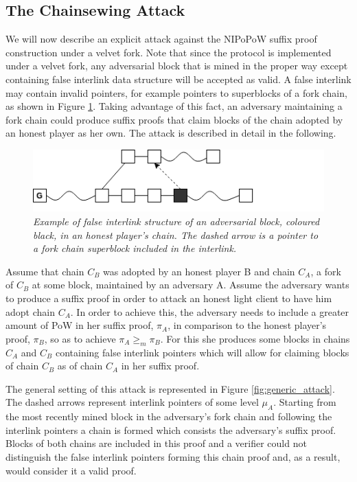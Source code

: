\documentclass[11pt,a4paper]{article}
\begin{document}
\subsection{The Chainsewing Attack}
We  will now describe an explicit attack against the NIPoPoW suffix proof construction under a velvet fork. Note that since the protocol is implemented under a velvet fork, any adversarial block that is mined in the proper way except containing false interlink data structure will be accepted as valid. A false interlink may contain invalid pointers, for example pointers to superblocks of a fork chain, as shown in Figure \ref{fig:false_interlink}.
Taking advantage of this fact, an adversary maintaining a fork chain could produce suffix proofs that claim blocks of the chain adopted by an honest player as her own. The attack is described in detail in the following.

\begin{figure}[h]
	\begin{center}
		\includegraphics[scale=0.6]{figures/false_interlink.png}
	\end{center}
	\caption{\textit{Example of false interlink structure of an adversarial block, coloured black, in an honest player's chain. The dashed arrow is a pointer to a fork chain superblock included in the interlink.}}
	\label{fig:false_interlink}
\end{figure}

Assume that chain $C_B$ was adopted by an honest player B and chain $C_A$, a fork of $C_B$ at some block, maintained by an adversary A. Assume the adversary wants to produce a suffix proof in order to attack an honest light client to have him adopt chain $C_A$. In order to achieve this, the adversary needs to include a greater amount of PoW in her suffix proof, $\pi_A$, in comparison to the honest player's proof, $\pi_B$, so as to achieve $\pi_A \geq_m \pi_B$. For this she produces some blocks in chains $C_A$ and $C_B$ containing false interlink pointers which will allow for claiming blocks of chain $C_B$ as of chain $C_A$ in her suffix proof.

The general setting of this attack is represented in Figure \ref{fig:generic_attack}. The dashed arrows represent interlink pointers of some level $\mu_A$. Starting from the most recently mined block in the adversary's fork chain and following the interlink pointers a chain is formed which consists the adversary's suffix proof. Blocks of both chains are included in this proof and a verifier could not distinguish the false interlink pointers forming this chain proof and, as a result, would consider it a valid proof. 
\end{document}
